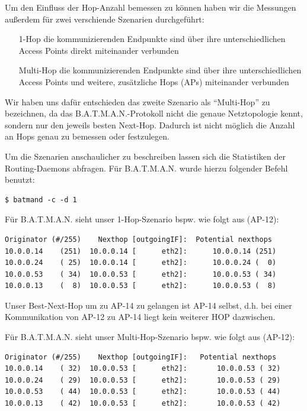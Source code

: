 \documentclass[a4paper,10pt]{article}
\begin{document}
Um den Einfluss der Hop-Anzahl bemessen zu können haben wir die Messungen außerdem für zwei verschiende Szenarien durchgeführt:
\begin{itemize}
  \item[1-Hop] die kommunizierenden Endpunkte sind über ihre unterschiedlichen Access Points direkt miteinander verbunden 
  \item[Multi-Hop] die kommunizierenden Endpunkte sind über ihre unterschiedlichen Access Points und weitere, zusätzliche Hops (APs) miteinander verbunden
\end{itemize}

Wir haben uns dafür entschieden das zweite Szenario als "`Multi-Hop"' zu bezeichnen, da das B.A.T.M.A.N.-Protokoll nicht die genaue Netztopologie kennt, sondern nur den jeweils besten Next-Hop.
Dadurch ist nicht möglich die Anzahl an Hops genau zu bemessen oder festzulegen.

Um die Szenarien anschaulicher zu beschreiben lassen sich die Statistiken der Routing-Daemons abfragen.
Für B.A.T.M.A.N. wurde hierzu folgender Befehl benutzt:

\begin{lstlisting}
$ batmand -c -d 1
\end{lstlisting}

Für B.A.T.M.A.N. sieht unser 1-Hop-Szenario bspw. wie folgt aus (AP-12):

\begin{lstlisting}
Originator (#/255)    Nexthop [outgoingIF]:  Potential nexthops
10.0.0.14    (251)  10.0.0.14 [      eth2]:      10.0.0.14 (251) 
10.0.0.24    ( 25)  10.0.0.14 [      eth2]:      10.0.0.24 (  0)
10.0.0.53    ( 34)  10.0.0.53 [      eth2]:      10.0.0.53 ( 34) 
10.0.0.13    (  8)  10.0.0.53 [      eth2]:      10.0.0.53 (  8)  
\end{lstlisting}

Unser Best-Next-Hop um zu AP-14 zu gelangen ist AP-14 selbst, d.h. bei einer Kommunikation von AP-12 zu AP-14 liegt kein weiterer HOP dazwischen.

Für B.A.T.M.A.N. sieht unser Multi-Hop-Szenario bspw. wie folgt aus (AP-12):

\begin{lstlisting}
Originator (#/255)    Nexthop [outgoingIF]:   Potential nexthops
10.0.0.14    ( 32)  10.0.0.53 [      eth2]:       10.0.0.53 ( 32)
10.0.0.24    ( 29)  10.0.0.53 [      eth2]:       10.0.0.53 ( 29)
10.0.0.53    ( 44)  10.0.0.53 [      eth2]:       10.0.0.53 ( 44)
10.0.0.13    ( 42)  10.0.0.53 [      eth2]:       10.0.0.53 ( 42)
\end{lstlisting}
\end{document}
